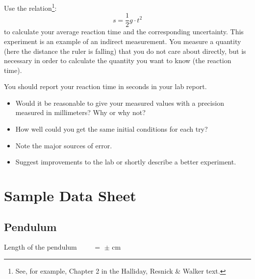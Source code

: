 \documentclass{article}
\begin{document}
Use the relation\footnote{See, for example, Chapter 2 in the Halliday, Resnick \& Walker text.}:
\begin{equation}
    s = \frac{1}{2}g\cdot t^2
\end{equation}
to calculate your average reaction time and the corresponding uncertainty. This experiment is an example of an indirect measurement. You measure a quantity (here the distance the ruler is falling) that you do not care about directly, but is necessary in order to calculate the quantity you want to know (the reaction time).\myskip

You should report your reaction time in seconds in your lab report.

\begin{itemize}
    \item Would it be reasonable to give your measured values with a precision measured in millimeters? Why or why not?
    \item How well could you get the same initial conditions for each try?
    \item Note the major sources of error.
    \item Suggest improvements to the lab or shortly describe a better experiment.
\end{itemize}
\newpage
\section{Sample Data Sheet}

\subsection{Pendulum}

Length of the pendulum $\qquad = $ \hspace{2cm} $\pm$ \hspace{2cm} $\mathrm{cm}$
\end{document}
